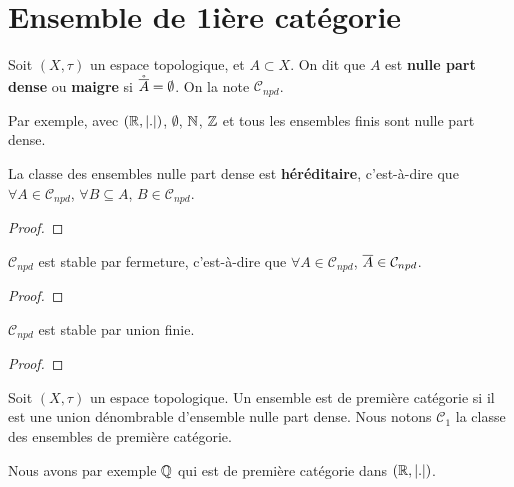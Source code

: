 \chapter{Ensemble de 1ière catégorie}

\begin{definition}
	Soit $(X, \tau)$ un espace topologique, et $A \subset X$. On dit que $A$ est
	\textbf{nulle part dense} ou \textbf{maigre} si $\mathring{\overline{A}} =
	\emptyset$. On la note $\mathcal{C}_{npd}$.
\end{definition}

Par exemple, avec $(\mathbb{R}, |.|)$, $\emptyset$, $\mathbb{N}$, $\mathbb{Z}$ et tous
les ensembles finis sont nulle part dense.

\begin{proposition}
	La classe des ensembles nulle part dense est \textbf{héréditaire},
	c'est-à-dire que $\forall A \in \mathcal{C}_{npd}$, $\forall B \subseteq A$,
	$B \in \mathcal{C}_{npd}$.
\end{proposition}

\begin{proof}
	
\end{proof}

\begin{proposition}
	$\mathcal{C}_{npd}$ est stable par fermeture, c'est-à-dire que $\forall A
	\in \mathcal{C}_{npd}$, $\overline{A} \in \mathcal{C}_{npd}$.
\end{proposition}

\begin{proof}
	
\end{proof}

\begin{proposition}
	$\mathcal{C}_{npd}$ est stable par union finie.
\end{proposition}

\begin{proof}
	
\end{proof}

\begin{definition}
	Soit $(X, \tau)$ un espace topologique.
	Un ensemble est de première catégorie si il est une union dénombrable
	d'ensemble nulle part dense. Nous notons $\mathcal{C}_{1}$ la classe des
	ensembles de première catégorie.
\end{definition}

Nous avons par exemple $\mathbb{Q}$ qui est de première catégorie dans $(\mathbb{R},
|.|)$.

